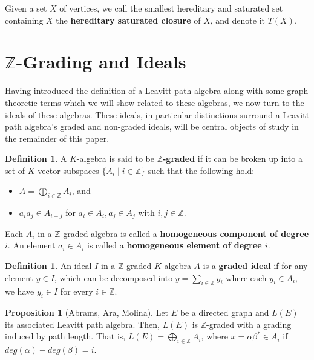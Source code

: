 \documentclass[12pt]{amsart}
\theoremstyle{plain} \numberwithin{equation}{section}
\theoremstyle{definition}
\newtheorem{proposition}[theorem]{Proposition}
\newtheorem{definition}[theorem]{Definition}
\theoremstyle{definition}
\begin{document}
Given a set $X$ of vertices, we call the smallest hereditary and saturated set containing $X$ the \textbf{hereditary saturated closure} of $X$, and denote it $T(X)$.

\section*{\texorpdfstring{$\mathbb{Z}$-Grading and Ideals}{Z-Grading and Ideals}}

Having introduced the definition of a Leavitt path algebra along with some graph theoretic terms which we will show related to these algebras, we now turn to the ideals of these algebras. These ideals, in particular distinctions surround a Leavitt path algebra's graded and non-graded ideals, will be central objects of study in the remainder of this paper. 

\begin{definition}
    A $K$-algebra is said to be \textbf{$\mathbb{Z}$-graded} if it can be broken up into a set of $K$-vector subspaces $\{A_i \mid i\in\mathbb{Z}\}$ such that the following hold:
    \begin{itemize}
        \item [($i$)] $A = \bigoplus_{i\in\mathbb{Z}}A_i$, and
        \item [($ii$)] $a_ia_j\in A_{i+j}$ for $a_i\in A_i, a_j\in A_j$ with $i,j\in\mathbb{Z}$.
    \end{itemize}
    Each $A_i$ in a $\mathbb{Z}$-graded algebra is called a \textbf{homogeneous component of degree $i$}. An element $a_i\in A_i$ is called a \textbf{homogeneous element of degree $i$}. 
\end{definition}

\begin{definition}
    An ideal $I$ in a $\mathbb{Z}$-graded $K$-algebra $A$ is a \textbf{graded ideal} if for any element $y \in I$, which can be decomposed into $y = \sum_{i\in\mathbb{Z}}y_i$ where each $y_i\in A_i$, we have $y_i\in I$ for every $i\in\mathbb{Z}$. 
\end{definition}

\begin{proposition}[Abrams, Ara, Molina]
    Let $E$ be a directed graph and $L(E)$ its associated Leavitt path algebra. Then, $L(E)$ is $\mathbb{Z}$-graded with a grading induced by path length. That is, $L(E) = \bigoplus_{i\in\mathbb{Z}}A_i$, where $x = \alpha\beta^* \in A_i$ if $deg(\alpha) - deg(\beta) = i$.
\end{proposition}
\end{document}
